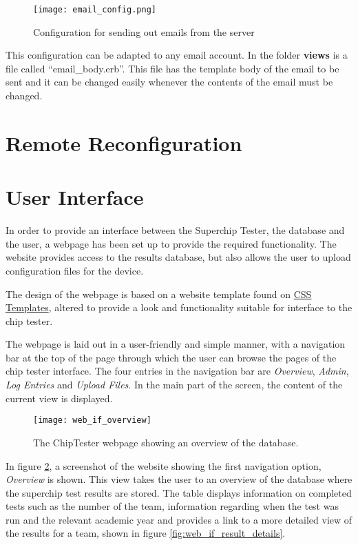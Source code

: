 \begin{figure}[htb]
\centering
\texttt{[image: email\_config.png]}
\caption{Configuration for sending out emails from the server}
\label{fig:email_server}
\end{figure}

This configuration can be adapted to any email account. In the folder {\bf views} is a file called ``email\_body.erb''. This file has the template body of the email to be sent and it can be changed easily whenever the contents of the email must be changed.

\section{Remote Reconfiguration}

\section{User Interface}

In order to provide an interface between the Superchip Tester, the database and the user, a webpage has been set up to provide the required functionality. The website provides access to the results database, but also allows the user to upload configuration files for the device.

The design of the webpage is based on a website template found on \href{http://www.freecsstemplates.org/}{CSS Templates}, altered to provide a look and functionality suitable for interface to the chip tester.

The webpage is laid out in a user-friendly and simple manner, with a navigation bar at the top of the page through which the user can browse the pages of the chip tester interface. The four entries in the navigation bar are \textit{Overview}, \textit{Admin}, \textit{Log Entries} and \textit{Upload Files}. In the main part of the screen, the content of the current view is displayed.

\begin{figure}[ht]
 \centering
 \texttt{[image: web\_if\_overview]}
 \caption{The ChipTester webpage showing an overview of the database.}
 \label{fig:web_if_overview}
\end{figure}

In figure \ref{fig:web_if_overview}, a screenshot of the website showing the first navigation option, \textit{Overview} is shown. This view takes the user to an overview of the database where the superchip test results are stored. The table displays information on completed tests such as the number of the team, information regarding when the test was run and the relevant academic year and provides a link to a more detailed view of the results for a team, shown in figure \ref{fig:web_if_result_details}.

